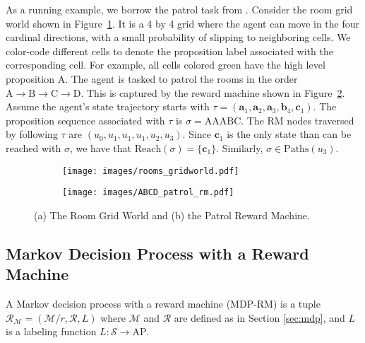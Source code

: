 \documentclass[letterpaper, 10 pt, conference]{ieeeconf}
\newcommand{\figureref}[1]{Figure~\ref{#1}}
\begin{document}
As a running example, we borrow the patrol task from \cite{icarte2018using}. Consider the room grid world shown in \figureref{fig:gridworldroom}. It is a 4 by 4 grid where the agent can move in the four cardinal directions, with a small probability of slipping to neighboring cells. We color-code different cells to denote the proposition label associated with the corresponding cell. For example, all cells colored green have the high level proposition $\mathrm{A}$. The agent is tasked to patrol the rooms in the order $\mathrm{A}\to\mathrm{B}\to\mathrm{C}\to\mathrm{D}$. This is captured by the reward machine shown in \figureref{fig:patrol_rm}. Assume the agent's state trajectory starts with $\tau = (\mathbf{a}_1,\mathbf{a}_2,\mathbf{a}_3,\mathbf{b}_4,\mathbf{c}_1)$. The proposition sequence associated with $\tau$ is $\sigma = \mathrm{AAABC}$. The RM nodes traversed by following $\tau$ are $(u_0, u_1,u_1,u_1, u_2,u_3)$. Since $\mathbf{c}_1$ is the only state than can be reached with $\sigma$, we have that $\mathrm{Reach}(\sigma) = \{\mathbf{c}_1\}$. Similarly, $\sigma \in \mathrm{Paths}(u_3)$.
 
\begin{figure}[h!]
    \centering
    \begin{subfigure}[t]{0.18\textwidth}
        \centering
        \texttt{[image: images/rooms\_gridworld.pdf]}
        \caption{}
        \label{fig:gridworldroom}
    \end{subfigure}
    \hfill
    \begin{subfigure}[t]{0.27\textwidth}
        \centering
        \texttt{[image: images/ABCD\_patrol\_rm.pdf]}
        \caption{}
        \label{fig:patrol_rm}
    \end{subfigure}
    \caption{(a) The Room Grid World and (b) the Patrol Reward Machine.}
    \label{fig:overall}
\end{figure}
\vspace{-0.4cm}
 
\vspace{-0.2cm}
\subsection{Markov Decision Process with a Reward Machine}
A Markov decision process with a reward machine (MDP-RM) is a tuple $\mathcal{R}_{\mathcal{M}} = (\mathcal{M}/r,\mathcal{R},L)$ where $\mathcal{M}$ and $\mathcal{R}$ are defined as in Section \ref{sec:mdp}, and $L$ is a labeling function $L:\mathcal{S}\to \mathrm{AP}$. 
 
\end{document}
